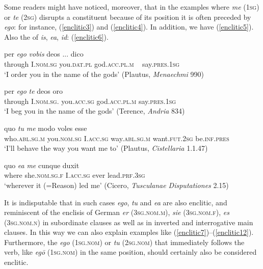Some readers might have noticed, moreover, that in the examples where \emph{me} (\textsc{1sg}) or \emph{te} (\textsc{2sg}) disrupts a constituent because of its position it is often preceded by \emph{ego}: for instance, (\ref{enclitic3}) and (\ref{enclitic4}). In addition, we have (\ref{enclitic5}). Also the  of \emph{is}, \emph{ea}, \emph{id}: (\ref{enclitic6}).

\begin{exe}
\ex
\gll per \emph{ego} \emph{vobis} deos ... dico\\
through I.\textsc{nom.sg} you.\textsc{dat.pl} god.\textsc{acc.pl.m} ~ say.\textsc{pres.1sg}\\ 
\trans `I order you in the name of the gods' (Plautus, \textit{Menaechmi} 990) 
\label{enclitic3}
\end{exe}

\begin{exe}
\ex
\gll per \emph{ego} \emph{te} deos oro\\
through I.\textsc{nom.sg.} you.\textsc{acc.sg} god.\textsc{acc.pl.m} say.\textsc{pres.1sg}\\ 
\trans `I beg you in the name of the gods' (Terence, \textit{Andria} 834) 
\label{enclitic4}
\end{exe}

\begin{exe}
\ex
\gll quo \emph{tu} \emph{me} modo voles esse\\
who.\textsc{abl.sg.m} you.\textsc{nom.sg} I.\textsc{acc.sg} way.\textsc{abl.sg.m} want.\textsc{fut.2sg} be.\textsc{inf.pres}\\
\trans `I'll behave the way you want me to' (Plautus, \textit{Cistellaria} 1.1.47) 
\label{enclitic5}
\end{exe}%

\begin{exe}
\ex
\gll quo \emph{ea} \emph{me} cunque duxit\\
where she.\textsc{nom.sg.f} I.\textsc{acc.sg} ever lead.\textsc{prf.3sg}\\
\trans `wherever it (=Reason) led me' (Cicero, \textit{Tusculanae Disputationes} 2.15) 
\label{enclitic6}
\end{exe}%

It is indisputable that in such cases \emph{ego}, \emph{tu} and \emph{ea} are also enclitic, and reminiscent of the enclisis of German \emph{er} (\textsc{3sg.nom.m}), \emph{sie} (\textsc{3sg.nom.f}), \emph{es} (\textsc{3sg.nom.n}) in subordinate clauses as well as in inverted and interrogative main clauses. In this way we can also explain examples like (\ref{enclitic7})--(\ref{enclitic12}). Furthermore, the \emph{ego} (\textsc{1sg.nom}) or \emph{tu} (\textsc{2sg.nom}) that immediately follows the verb, like  \emph{egō} (\textsc{1sg.nom}) in the same position, should certainly also be considered enclitic.

